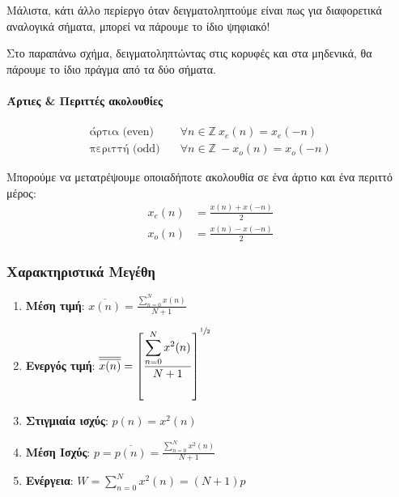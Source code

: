 \documentclass[11pt,a4paper,notitlepage,fleqn]{article}
\begin{document}
Μάλιστα, κάτι άλλο περίεργο όταν δειγματοληπτούμε είναι πως για διαφορετικά αναλογικά σήματα, μπορεί
να πάρουμε το ίδιο ψηφιακό!


Στο παραπάνω σχήμα, δειγματοληπτώντας στις κορυφές και στα μηδενικά, θα πάρουμε το ίδιο πράγμα από
τα δύο σήματα.

\paragraph{Άρτιες \& Περιττές ακολουθίες}
\begin{align*}
	\text{άρτια (even)} &\quad \forall n \in \mathbb Z \ x_e(n) = x_e(-n) \\
	\text{περιττή (odd)} &\quad \forall n \in \mathbb Z \ -x_o(n) = x_o(-n)
\end{align*}

Μπορούμε να μετατρέψουμε οποιαδήποτε ακολουθία σε ένα άρτιο και ένα περιττό μέρος:
\begin{align*}
	x_e(n) &= \frac{x(n) + x(-n)}{2}\\
	x_o(n) &= \frac{x(n) - x(-n)}{2}
\end{align*}

\subsubsection{Χαρακτηριστικά Μεγέθη}
\begin{enumerate}
	\item \textbf{Μέση τιμή}:
	\( \displaystyle
	\overline{x(n)} = \frac{\displaystyle \sum_{n=0}^{N} x(n)}{N+1}
	 \)
	\item \textbf{Ενεργός τιμή}:
	\( 
	\displaystyle
	\overline{\overline{x(n)}} = \left[
	\frac{\displaystyle \sum_{n=0}^{N} x^2(n)}{N+1}
	\right]^{\sfrac{1}{2} }
	 \)
	\item \textbf{Στιγμιαία ισχύς}:
	\( 
	\displaystyle
	p(n) = x^2(n)
	 \)
	\item \textbf{Μέση Ισχύς}:
	\( 
	\displaystyle
	p = \overline{p(n)} = \frac{\displaystyle \sum_{n=0}^{N} x^2(n)}{N+1}
	 \)
	\item \textbf{Ενέργεια}:
	\( 
	\displaystyle
	W = \sum_{n=0}^{N} x^2(n) = (N+1)p
	 \)
\end{enumerate}
\end{document}

